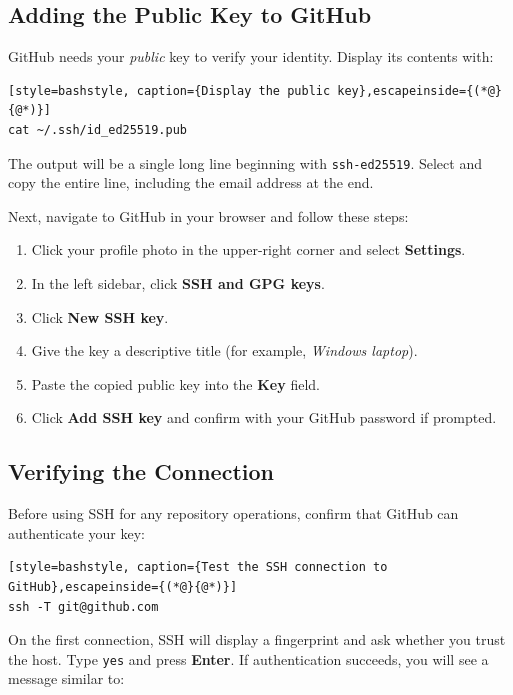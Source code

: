 \subsection{Adding the Public Key to GitHub}

GitHub needs your \emph{public} key to verify your identity. Display its contents with:

\begin{lstlisting}[style=bashstyle, caption={Display the public key},escapeinside={(*@}{@*)}]
cat ~/.ssh/id_ed25519.pub
\end{lstlisting}

The output will be a single long line beginning with \texttt{ssh-ed25519}. Select and copy the entire line, including the email address at the end.

Next, navigate to GitHub in your browser and follow these steps:

\begin{enumerate}
    \item Click your profile photo in the upper-right corner and select \textbf{Settings}.
    \item In the left sidebar, click \textbf{SSH and GPG keys}.
    \item Click \textbf{New SSH key}.
    \item Give the key a descriptive title (for example, \textit{Windows laptop}).
    \item Paste the copied public key into the \textbf{Key} field.
    \item Click \textbf{Add SSH key} and confirm with your GitHub password if prompted.
\end{enumerate}

\subsection{Verifying the Connection}

Before using SSH for any repository operations, confirm that GitHub can authenticate your key:

\begin{lstlisting}[style=bashstyle, caption={Test the SSH connection to GitHub},escapeinside={(*@}{@*)}]
ssh -T git@github.com
\end{lstlisting}

On the first connection, SSH will display a fingerprint and ask whether you trust the host. Type \texttt{yes} and press \textbf{Enter}. If authentication succeeds, you will see a message similar to:

